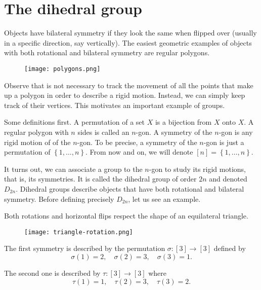 \documentclass[11pt,a4paper]{article}
\begin{document}
\def\contador{Lesson 4}


\section{The dihedral group}

Objects have bilateral
symmetry if they look the same when flipped over (usually in a specific direction, say vertically).
The easiest geometric examples of objects
with both rotational and bilateral symmetry are regular polygons.

\begin{figure}[!htb]
    \centering
    \texttt{[image: polygons.png]}
\end{figure}

Observe that is not necessary to track the movement of all the points that make up a  polygon in order to describe a rigid motion. 
Instead, we can simply keep track of their vertices.
This motivates  an important example of groups.

Some definitions first.
A permutation of a set \(X\) is a bijection from \(X\) onto \(X\).
A regular polygon with $n$ sides is called an $n$-gon.
A symmetry of the \(n\)-gon is any rigid motion of of the \(n\)-gon.
To be precise,  a symmetry of the \(n\)-gon is just a permutation of \(\left\{ 1,\ldots, n \right\}\). From now and on, we will denote \([n] = \left\{ 1,\ldots, n \right\}\).

It turns out, we can associate a group to the \(n\)-gon to study its rigid motions, that is, its symmetries.
It is called the dihedral group of order \(2n\) and denoted \(D_{2n}\).
Dihedral groups describe objects that have both rotational and bilateral symmetry.
Before defining precisely \(D_{2n}\), let us see an example.


\begin{exa}
    Both rotations and horizontal flips respect the shape of an equilateral triangle.

\begin{figure}[!htb]
    \centering
    \texttt{[image: triangle-rotation.png]}
\end{figure}

The first symmetry is described by the permutation \(\sigma\colon [3]\to [3]\) defined by 
\[\sigma(1)=2,\quad\sigma(2)=3,\quad \sigma(3) = 1.\]

The second one is described by \(\tau\colon [3]\to [3]\) where 
\[\tau(1)=1,\quad\tau(2)=3,\quad \tau(3) = 2.\]
\end{exa}
\end{document}
